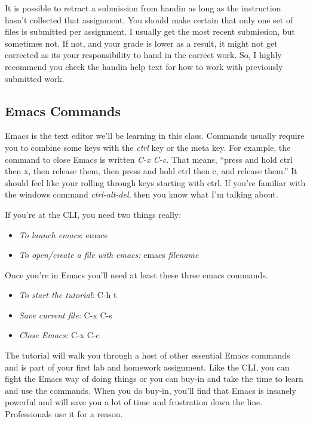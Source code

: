 \documentclass[]{tufte-handout}
\begin{document}
It is possible to retract a submission from handin as long as the instruction hasn't collected that assignment. You should make certain that only one set of files is submitted per assignment. I usually get the most recent submission, but sometimes not. If not, and your grade is lower as a result, it might not get corrected as its your responsibility to hand in the correct work. So, I highly recommend you check the handin help text for how to work with previously submitted work.

\subsection{Emacs Commands}

Emacs is the text editor we'll be learning in this class. Commands usually require you to combine some keys with the \textit{ctrl} key or the meta key. For example, the command to close Emacs is written \textit{C-x C-c}. That means, ``press and hold ctrl then x, then release them, then press and hold ctrl then c, and release them.''  It should feel like your rolling through keys starting with ctrl.  If you're familiar with the windows command \textit{ctrl-alt-del}, then you know what I'm talking about. 

If you're at the CLI, you need two things really:
\begin{itemize}
\item \textit{To launch emacs}: emacs
\item \textit{To open/create a file with emacs:} emacs \textit{filename}
\end{itemize}

Once you're in Emacs you'll need at least these three emacs commands.
\begin{itemize}
\item \textit{To start the tutorial}: C-h t
\item \textit{Save current file:} C-x C-s
\item \textit{Close Emacs:} C-x C-c
\end{itemize}

The tutorial will walk you through a host of other essential Emacs commands and is part of your first lab and homework assignment.  Like the CLI, you can fight the Emacs way of doing things or you can buy-in and take the time to learn and use the commands. When you do buy-in, you'll find that Emacs is insanely powerful and will save you a lot of time and frustration down the line. Professionals use it for a reason.
\end{document}
